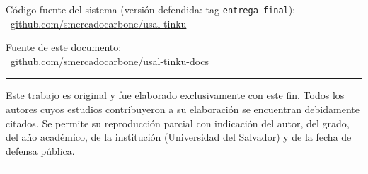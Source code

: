 
\mbox{}
\vfill

{\small\onehalfspacing
\begin{center}

    Código fuente del sistema (versión defendida: tag \texttt{entrega-final}):\\[2pt]
    {\large\faGithub}~\href{https://github.com/smercadocarbone/usal-tinku/tree/entrega-final}{github.com/smercadocarbone/usal-tinku}

    \medskip
    Fuente de este documento:\\[2pt]
    {\large\faGithub}~\href{https://github.com/smercadocarbone/usal-tinku-docs}{github.com/smercadocarbone/usal-tinku-docs}

    \bigskip

\noindent\rule{\textwidth}{1pt} %

    Este trabajo es original y fue elaborado exclusivamente con este fin.
    Todos los autores cuyos estudios contribuyeron a su elaboración se
    encuentran debidamente citados. Se permite su reproducción parcial con
    indicación del autor, del grado, del año académico, de la institución
    (Universidad del Salvador) y de la fecha de defensa pública.

\noindent\rule{\textwidth}{.2pt} %

\end{center}
} %
